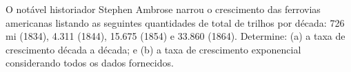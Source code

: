 O notável historiador Stephen Ambrose narrou o crescimento das ferrovias americanas listando as seguintes quantidades de total de trilhos por década: 726 mi (1834), 4.311 (1844), 15.675 (1854) e 33.860 (1864). Determine: (a) a taxa de crescimento década a década; e (b) a taxa de crescimento exponencial considerando todos os dados fornecidos.
